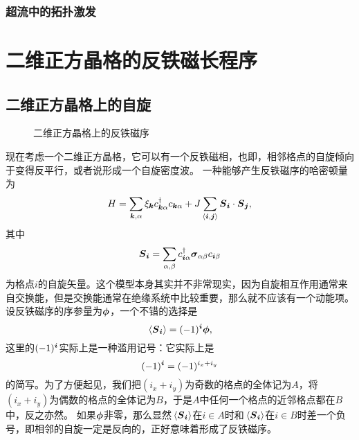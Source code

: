 \subsubsection{超流中的拓扑激发}

\section{二维正方晶格的反铁磁长程序}

\subsection{二维正方晶格上的自旋}

\begin{figure}
    \centering
    \subfigure[自旋密度波]{
              
    }
    \subfigure[SDW形成后的两条子格子]{
        
    }
    \caption{二维正方晶格上的反铁磁序}
\end{figure}

现在考虑一个二维正方晶格，它可以有一个反铁磁相，也即，相邻格点的自旋倾向于变得反平行，或者说形成一个自旋密度波。
一种能够产生反铁磁序的哈密顿量为
\begin{equation}
    {H} = \sum_{\vb*{k}, \alpha} \xi_{\vb*{k}} {c}_{\vb*{k} \alpha}^\dagger {c}_{\vb*{k} \alpha} + J \sum_{\langle \vb*{i}, \vb*{j} \rangle} {\vb*{S}}_{\vb*{i}} \cdot {\vb*{S}}_{\vb*{j}},
    \label{eq:2dim-square-spin}
\end{equation}
其中
\begin{equation}
    {\vb*{S}}_{\vb*{i}} = \sum_{\alpha, \beta} {c}^\dagger_{\vb*{i} \alpha} \vb*{\sigma}_{\alpha \beta} {c}_{\vb*{i} \beta}
    \label{eq:spin-wave-order-parameter}
\end{equation}
为格点$i$的自旋矢量。这个模型本身其实并不非常现实，因为自旋相互作用通常来自交换能，但是交换能通常在绝缘系统中比较重要，那么就不应该有一个动能项。
设反铁磁序的序参量为$\vb*{\phi}$，一个不错的选择是
\begin{equation}
    \expval*{{\vb*{S}}_{\vb*{i}}} = (-1)^{\vb*{i}} \vb*{\phi},
\end{equation}
这里的$(-1)^{\vb*{i}}$实际上是一种滥用记号：它实际上是
\[
    (-1)^{\vb*{i}} = (-1)^{i_x + i_y}
\]
的简写。为了方便起见，我们把$(i_x + i_y)$为奇数的格点的全体记为$A$，将$(i_x + i_y)$为偶数的格点的全体记为$B$，于是$A$中任何一个格点的近邻格点都在$B$中，反之亦然。
如果$\vb*{\phi}$非零，那么显然$\expval*{{\vb*{S}}_{\vb*{i}}}$在$i \in A$时和$\expval*{{\vb*{S}}_{\vb*{i}}}$在$i \in B$时差一个负号，即相邻的自旋一定是反向的，正好意味着形成了反铁磁序。

